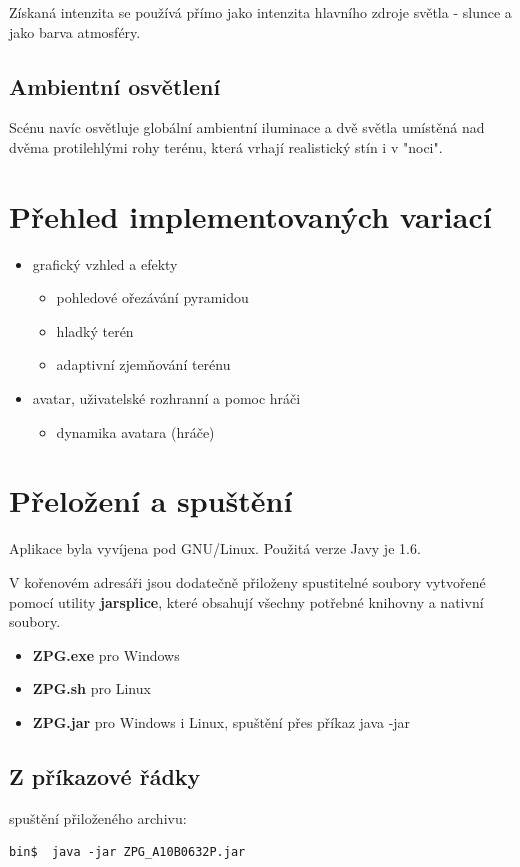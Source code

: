 \documentclass{zcu_sp}
\begin{document}
Získaná intenzita se používá přímo jako intenzita hlavního zdroje světla - slunce a jako barva atmosféry.
\subsection{Ambientní osvětlení}
Scénu navíc osvětluje globální ambientní iluminace a dvě světla umístěná nad
dvěma protilehlými rohy terénu, která vrhají realistický stín i v "noci".

\section{Přehled implementovaných variací}
\begin{itemize}
	\item grafický vzhled a efekty
	\begin{itemize}
		\item pohledové ořezávání pyramidou
		\item hladký terén
		\item adaptivní zjemňování terénu
	\end{itemize}

	\item avatar, uživatelské rozhranní a pomoc hráči
	\begin{itemize}
		\item dynamika avatara (hráče)
	\end{itemize}
\end{itemize}

\section{Přeložení a spuštění}
Aplikace byla vyvíjena pod GNU/Linux. Použitá verze Javy je 1.6.

V kořenovém adresáři jsou dodatečně přiloženy spustitelné soubory vytvořené
pomocí utility \textbf{jarsplice}, které obsahují všechny potřebné knihovny a
nativní soubory.
\begin{itemize}
	\item \textbf{ZPG.exe} pro Windows
	\item \textbf{ZPG.sh} pro Linux
	\item \textbf{ZPG.jar} pro Windows i Linux, spuštění přes příkaz java -jar
\end{itemize}

\subsection{Z příkazové řádky}
spuštění přiloženého archivu:
\begin{verbatim}
bin$  java -jar ZPG_A10B0632P.jar
\end{verbatim}
\end{document}

